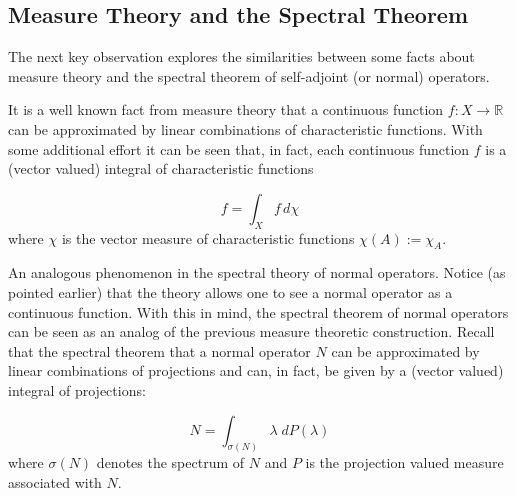 \documentclass[12pt]{article}
\begin{document}
\subsection{Measure Theory and the Spectral Theorem}

The next key observation explores the similarities between some facts about measure theory and the spectral theorem of self-adjoint (or normal) operators.

It is a well known fact from measure theory that a continuous function $f:X \longrightarrow \mathbb{R}$ can be approximated by linear combinations of characteristic functions. With some additional effort it can be seen that, in fact, each continuous function $f$ is a (vector valued) integral of characteristic functions

\begin{displaymath}
f = \int_X f\, d\chi
\end{displaymath}
where $\chi$ is the vector measure of characteristic functions $\chi(A):= \chi_A$.

An analogous phenomenon  in the spectral theory of normal operators. Notice (as pointed earlier) that the  theory allows one to see a normal operator as a continuous function. With this  in mind, the spectral theorem of normal operators can be seen as an analog of the previous measure theoretic construction. Recall that the spectral theorem  that a normal operator $N$ can be approximated by linear combinations of projections and can, in fact, be given by a (vector valued) integral of projections:

\begin{displaymath}
N = \int_{\sigma(N)} \lambda\; dP(\lambda)
\end{displaymath}
where $\sigma(N)$ denotes the spectrum of $N$ and $P$ is the projection valued measure associated with $N$.
\end{document}
